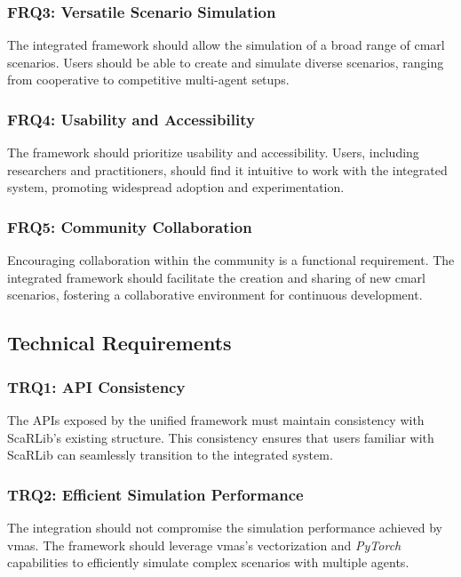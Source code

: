 \documentclass[12pt,a4paper,openright,twoside]{book}
\begin{document}
\subsubsection{FRQ3: Versatile Scenario Simulation}
The integrated framework should allow the simulation of a broad range of \ac{cmarl} scenarios. Users should be able to create and simulate diverse scenarios, ranging from cooperative to competitive multi-agent setups.

\subsubsection{FRQ4: Usability and Accessibility}
The framework should prioritize usability and accessibility. Users, including researchers and practitioners, should find it intuitive to work with the integrated system, promoting widespread adoption and experimentation.

\subsubsection{FRQ5: Community Collaboration}
Encouraging collaboration within the community is a functional requirement. The integrated framework should facilitate the creation and sharing of new \ac{cmarl} scenarios, fostering a collaborative environment for continuous development.

\subsection{Technical Requirements}

\subsubsection{TRQ1: API Consistency}
The APIs exposed by the unified framework must maintain consistency with ScaRLib's existing structure. This consistency ensures that users familiar with ScaRLib can seamlessly transition to the integrated system.

\subsubsection{TRQ2: Efficient Simulation Performance}
The integration should not compromise the simulation performance achieved by \ac{vmas}. The framework should leverage \ac{vmas}'s vectorization and \emph{PyTorch} capabilities to efficiently simulate complex scenarios with multiple agents.
\end{document}
